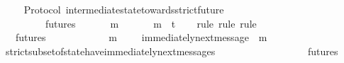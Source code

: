 \begin{isabellebody}
\ \ \isamarkupfalse%
\isanewline
{}\isamarkupfalse%
%
\endisatagproof
{\isafoldproof}%
%
\isadelimproof
\isanewline
%
\endisadelimproof
\isanewline
{}\isamarkupfalse%
\ {\isacharparenleft}\ Protocol{\isacharparenright}\ intermediate{\isacharunderscore}state{\isacharunderscore}towards{\isacharunderscore}strict{\isacharunderscore}future{\isacharcolon}\ \isanewline
\ \ {\isachardoublequoteopen}{\isasymforall}\ {\isasymsigma}\ {\isasymin}\ {\isasymSigma}{\isachardot}\ {\isasymforall}\ {\isasymsigma}{\isacharprime}\ {\isasymin}\ futures\ {\isasymsigma}{\isachardot}\ {\isasymsigma}\ {\isasymsubset}\ {\isasymsigma}{\isacharprime}\ {\isasymlongrightarrow}\ {\isacharparenleft}{\isasymexists}\ m\ {\isasymin}\ {\isasymsigma}{\isacharprime}\ {\isacharminus}\ {\isasymsigma}{\isachardot}\ {\isasymsigma}\ {\isasymunion}\ {\isacharbraceleft}m{\isacharbraceright}\ {\isasymin}\ {\isasymSigma}t{\isacharparenright}{\isachardoublequoteclose}\isanewline
%
\isadelimproof
\ \ %
\endisadelimproof
%
\isatagproof
{}\isamarkupfalse%
\ {\isacharparenleft}rule{\isacharcomma}\ rule{\isacharcomma}\ rule{\isacharparenright}\isanewline
{}\isamarkupfalse%
\ {\isacharminus}\ \isanewline
\ \ \isamarkupfalse%
\ {\isasymsigma}\ {\isasymsigma}{\isacharprime}\isanewline
\ \ \isamarkupfalse%
\ {\isachardoublequoteopen}{\isasymsigma}\ {\isasymin}\ {\isasymSigma}{\isachardoublequoteclose}\isanewline
\ \ \isamarkupfalse%
\ {\isachardoublequoteopen}{\isasymsigma}{\isacharprime}\ {\isasymin}\ futures\ {\isasymsigma}{\isachardoublequoteclose}\isanewline
\ \ \isamarkupfalse%
\ {\isachardoublequoteopen}{\isasymsigma}\ {\isasymsubset}\ {\isasymsigma}{\isacharprime}{\isachardoublequoteclose}\isanewline
\ \ \isamarkupfalse%
\ {\isachardoublequoteopen}{\isasymexists}\ m\ {\isasymin}\ {\isasymsigma}{\isacharprime}\ {\isacharminus}\ {\isasymsigma}{\isachardot}\ immediately{\isacharunderscore}next{\isacharunderscore}message\ {\isacharparenleft}{\isasymsigma}{\isacharcomma}\ m{\isacharparenright}{\isachardoublequoteclose}\isanewline
\ \ \ \ \isamarkupfalse%
\ strict{\isacharunderscore}subset{\isacharunderscore}of{\isacharunderscore}state{\isacharunderscore}have{\isacharunderscore}immediately{\isacharunderscore}next{\isacharunderscore}messages\isanewline
\ \ \ \ \ \ \ \ \ \ {\isacartoucheopen}{\isasymsigma}\ {\isasymin}\ {\isasymSigma}{\isacartoucheclose}\ {\isacartoucheopen}{\isasymsigma}\ {\isasymsubset}\ {\isasymsigma}{\isacharprime}{\isacartoucheclose}\ {\isacartoucheopen}{\isasymsigma}{\isacharprime}\ {\isasymin}\ futures\ {\isasymsigma}{\isacartoucheclose}\isanewline

\end{isabellebody}
